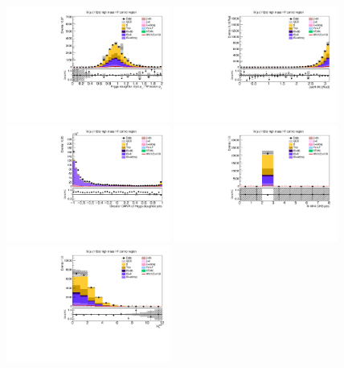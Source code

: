 \begin{figure}[tbp]
  \begin{center}
    \includegraphics[width=0.48\textwidth]{figures/wlnhbb2016/resolved/WmnWHHeavyFlavorCRHighMass_pTBalanceDijetW.pdf}
    \includegraphics[width=0.48\textwidth]{figures/wlnhbb2016/resolved/WmnWHHeavyFlavorCRHighMass_deltaPhiVH.pdf}
    \includegraphics[width=0.48\textwidth]{figures/wlnhbb2016/resolved/WmnWHHeavyFlavorCRHighMass_bDiscrMax.pdf}
    \includegraphics[width=0.48\textwidth]{figures/wlnhbb2016/resolved/WmnWHHeavyFlavorCRHighMass_nJet.pdf}
    \includegraphics[width=0.48\textwidth]{figures/wlnhbb2016/resolved/WmnWHHeavyFlavorCRHighMass_nSoft5.pdf}

\end{center}
\end{figure}
